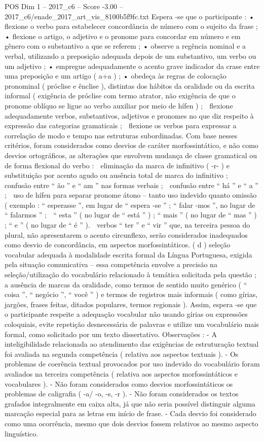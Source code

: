 \begin{textsample}{POS Dim 1 – 2017\_c6 – Score -3.00 – 2017\_c6/enade\_2017\_art\_vis\_8100b5f9fc.txt}
Espera -se que o participante : • flexione o verbo para estabelecer concordância de número com o sujeito da frase ; • flexione o artigo, o adjetivo e o pronome para concordar em número e em gênero com o substantivo a que se referem ; • observe a regência nominal e a verbal, utilizando a preposição adequada depois de um substantivo, um verbo ou um adjetivo ; • empregue adequadamente o acento grave indicador da crase entre uma preposição e um artigo ( a+a ) ; • obedeça às regras de colocação pronominal ( próclise e ênclise ), distintas dos hábitos da oralidade ou da escrita informal ( exigência de próclise com termo atrator, não exigência de que o pronome oblíquo se ligue ao verbo auxiliar por meio de hífen ) ;  flexione adequadamente verbos, substantivos, adjetivos e pronomes no que diz respeito à expressão das categorias gramaticais ;  flexione os verbos para expressar a correlação de modo e tempo nas estruturas subordinadas.
Com base nesses critérios, foram considerados como desvios de caráter morfossintático, e não como desvios ortográficos, as alterações que envolvem mudança de classe gramatical ou de forma flexional do verbo :  eliminação da marca de infinitivo ( -r- ) e substituição por acento agudo ou ausência total de marca do infinitivo ;  confusão entre “ ão ” e “ am ” nas formas verbais ;  confusão entre “ há ” e “ a ” ;  uso de hífen para separar pronome átono – tanto uso indevido quanto omissão ( exemplo : “ esperasse ”, em lugar de “ espera -se ” ; “ falar -mos ”, no lugar de “ falarmos ” ;  “ esta ” ( no lugar de “ está ” ) ; “ mais ” ( no lugar de “ mas ” ) ; “ e ” ( no lugar de “ é ” ).  verbos “ ter ” e “ vir ” que, na terceira pessoa do plural, não apresentarem o acento circunflexo, serão considerados inadequados como desvio de concordância, em aspectos morfossintáticos. ( d ) seleção vocabular adequada à modalidade escrita formal da Língua Portuguesa, exigida pela situação comunicativa – essa competência envolve a precisão na seleção/utilização do vocabulário relacionado à temática solicitada pela questão ; a ausência de marcas da oralidade, como termos de sentido muito genérico ( “ coisa ”, “ negócio ”, “ você ” ) e termos de registros mais informais ( como gírias, jargões, frases feitas, ditados populares, termos regionais ).
Assim, espera -se que o participante respeite a adequação vocabular não usando gírias ou expressões coloquiais, evite repetição desnecessária de palavras e utilize um vocabulário mais formal, como solicitado por um texto dissertativo.
Observações : - A inteligibilidade relacionada ao atendimento das exigências de estruturação textual foi avaliada na segunda competência ( relativa aos aspectos textuais ). - Os problemas de coerência textual provocados por uso indevido do vocabulário foram avaliados na terceira competência ( relativa aos aspectos morfossintáticos e vocabulares ). - Não foram considerados como desvios morfossintáticos os problemas de caligrafia ( -a/ -o, -s, -r ). - Não foram considerados os textos grafados integralmente em caixa alta, já que não seria possível distinguir alguma marcação especial para as letras em início de frase. - Cada desvio foi considerado como uma ocorrência, mesmo que dois desvios fossem relativos ao mesmo aspecto linguístico.

\end{textsample}
